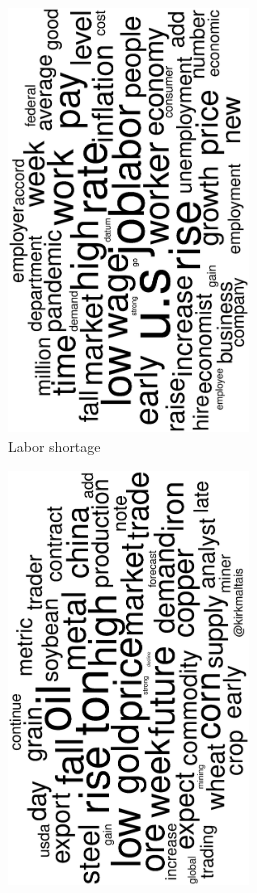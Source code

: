 \begin{figure}
\begin{subfigure}{0.32\textwidth}
		\includegraphics[width=0.7\textwidth,angle=270]{figures/wordcloud4.eps}
		\caption{Labor shortage}
	\end{subfigure}
	\begin{subfigure}{0.32\textwidth}
		\includegraphics[width=0.7\textwidth,angle=270]{figures/wordcloud14.eps}

\end{subfigure}
\end{figure}
